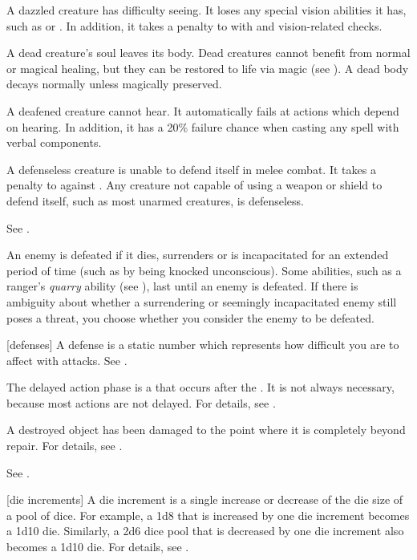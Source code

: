  A dazzled creature has difficulty seeing.
It loses any special vision abilities it has, such as  or .
In addition, it takes a  penalty to  with  and vision-related checks.

 A dead creature's soul leaves its body. Dead creatures cannot benefit from normal or magical healing, but they can be restored to life via magic (see ). A dead body decays normally unless magically preserved.

 A deafened creature cannot hear. It automatically fails at actions which depend on hearing. In addition, it has a 20\% failure chance when casting any spell with verbal components.

 A defenseless creature is unable to defend itself in melee combat. It takes a  penalty to  against . Any creature not capable of using a weapon or shield to defend itself, such as most unarmed creatures, is defenseless.

 See .

 An enemy is defeated if it dies, surrenders or is incapacitated for an extended period of time (such as by being knocked unconscious).
Some abilities, such as a ranger's \textit{quarry} ability (see ), last until an enemy is defeated.
If there is ambiguity about whether a surrendering or seemingly incapacitated enemy still poses a threat, you choose whether you consider the enemy to be defeated.

[defenses] A defense is a static number which represents how difficult you are to affect with attacks. See .

 The delayed action phase is a  that occurs after the .
It is not always necessary, because most actions are not delayed.
For details, see .

 A destroyed object has been damaged to the point where it is completely beyond repair.
For details, see .

 See .

[die increments] A die increment is a single increase or decrease of the die size of a pool of dice.
For example, a 1d8 that is increased by one die increment becomes a 1d10 die.
Similarly, a 2d6 dice pool that is decreased by one die increment also becomes a 1d10 die.
For details, see .

